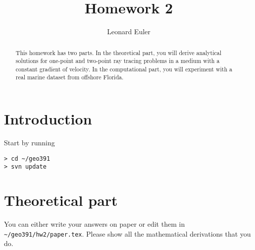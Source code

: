 \author{Leonard Euler} 
\title{Homework 2}

\begin{abstract}
This homework has two parts. In the theoretical part, you will derive
analytical solutions for one-point and two-point ray tracing problems
in a medium with a constant gradient of velocity. In the computational
part, you will experiment with a real marine dataset from offshore
Florida.
\end{abstract}

\section{Introduction}

Start by running
\begin{verbatim}
> cd ~/geo391
> svn update
\end{verbatim}

\section{Theoretical part}

You can either write your answers on paper or edit them in
\verb#~/geo391/hw2/paper.tex#. Please show all the mathematical
derivations that you do.

